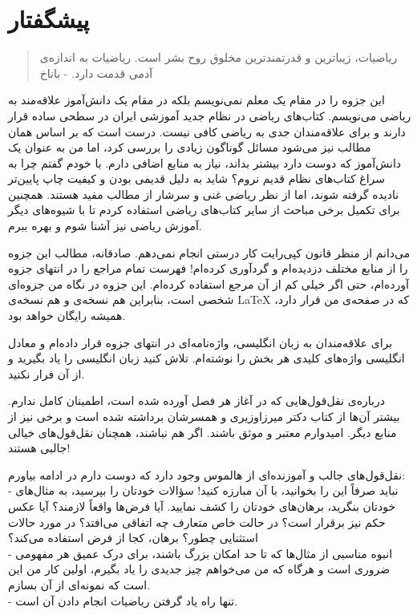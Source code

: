 \chapter{پیشگفتار}
\begin{quote}
	{\lotus
		ریاضیات، زیباترین و قدرتمندترین مخلوق روح بشر است. ریاضیات به اندازه‌ی آدمی قدمت دارد. \quad - باناخ%
	}
\end{quote}
این جزوه را در مقام یک معلم نمی‌نویسم بلکه در مقام یک دانش‌آموز علاقه‌مند به ریاضی می‌نویسم. کتاب‌های ریاضی در نظام جدید آموزشی ایران در سطحی ساده قرار دارند و برای علاقه‌مندان جدی به ریاضی کافی نیست. درست است که بر اساس همان مطالب نیز می‌شود مسائل گوناگون زیادی را بررسی کرد، اما من به عنوان یک دانش‌آموز که دوست دارد بیشتر بداند، نیاز به منابع اضافی دارم. با خودم گفتم چرا به سراغ کتاب‌های نظام قدیم نروم؟ شاید به دلیل قدیمی بودن و کیفیت چاپ پایین‌تر نادیده گرفته شوند، اما از نظر ریاضی غنی و سرشار از مطالب مفید هستند. همچنین برای تکمیل برخی مباحث از سایر کتاب‌های ریاضی استفاده کردم تا با شیوه‌های دیگر آموزش ریاضی نیز آشنا شوم و بهره ببرم.

می‌دانم از منظر قانون کپی‌رایت کار درستی انجام نمی‌دهم. صادقانه، مطالب این جزوه را از منابع مختلف دزدیده‌ام و گردآوری کرده‌ام! فهرست تمام مراجع را در انتهای جزوه آورده‌ام، حتی اگر خیلی کم از آن مرجع استفاده کرده‌ام. این جزوه در نگاه من جزوه‌ای شخصی است، بنابراین هم نسخه‌ی
و هم نسخه‌ی
\LaTeX
که در صفحه‌ی
من%
قرار دارد، همیشه رایگان خواهد بود.

برای علاقه‌مندان به زبان انگلیسی، واژه‌نامه‌ای در انتهای جزوه قرار داده‌ام و معادل انگلیسی واژه‌های کلیدی هر بخش را نوشته‌ام. تلاش کنید زبان انگلیسی را یاد بگیرید و از آن فرار نکنید.

درباره‌ی نقل‌قول‌هایی که در آغاز هر فصل آورده شده است، اطمینان کامل ندارم. بیشتر آن‌ها از کتاب دکتر میرزاوزیری و همسرشان برداشته شده است و برخی نیز از منابع دیگر. امیدوارم معتبر و موثق باشند. اگر هم نباشند، همچنان نقل‌قول‌های خیالی جالبی هستند!

نقل‌قول‌های جالب و آموزنده‌ای از هالموس%
وجود دارد که دوست دارم در ادامه بیاورم: \\
- نباید صرفاً این را بخوانید، با آن مبارزه کنید! سؤالات خودتان را بپرسید، به مثال‌های خودتان بنگرید، برهان‌های خودتان را کشف نمایید. آیا فرض‌ها واقعاً لازمند؟ آیا عکس حکم نیز برقرار است؟ در حالت خاص متعارف چه اتفاقی می‌افتد؟ در مورد حالات استثنایی چطور؟ برهان، کجا از فرض استفاده می‌کند؟ \\
- انبوه مناسبی از مثال‌ها که تا حد امکان بزرگ باشند، برای درک عمیق هر مفهومی ضروری است و هرگاه که من می‌خواهم چیز جدیدی را یاد بگیرم، اولین کار من این است که نمونه‌ای از آن بسازم. \\
- تنها راه یاد گرفتن ریاضیات انجام دادن آن است.

